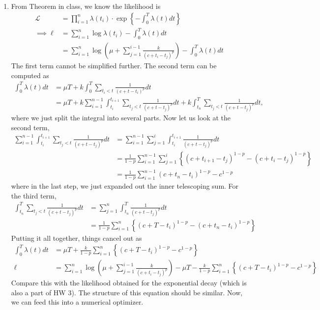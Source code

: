 \documentclass[11pt]{article}
\begin{document}
\begin{enumerate}
\begin{enumerate}
\item From Theorem in class, we know the likelihood is
\begin{align*}
	\mathcal{L} &= \prod_{i=1}^n \lambda(t_i) \cdot \exp\left\{ - \int_0^T \lambda(t) dt \right\} \\
	\implies \ell &= \sum_{i=1}^n \log \lambda(t_i)  - \int_0^T \lambda(t) dt \\
	&= \sum_{i=1}^n \log \left( \mu + \sum_{j=1}^{i-1} \frac{k}{(c + t_i - t_j)^p} \right)  - \int_0^T \lambda(t) dt
\end{align*}
The first term cannot be simplified further. The second term can be computed as
\begin{align*}
	\int_0^T \lambda(t) dt &= \mu T + k \int_0^T \sum_{t_i < t} \frac{1}{(c + t - t_i)^p} dt \\
	&= \mu T + k \sum_{i=1}^{n-1} \int_{t_i}^{t_{i+1}} \sum_{t_j < t} \frac{1}{(c + t - t_j)^p} dt + k \int_{t_n}^{T} \sum_{t_j < t} \frac{1}{(c + t - t_j)^p} dt,
\end{align*}
where we just split the integral into several parts. Now let us look at the second term,
\begin{align*}
	\sum_{i=1}^{n-1} \int_{t_i}^{t_{i+1}} \sum_{t_j < t} \frac{1}{(c + t - t_j)^p} dt &= \sum_{i=1}^{n-1} \sum_{j = 1}^i \int_{t_i}^{t_{i+1}}  \frac{1}{(c + t - t_j)^p} dt \\
	&= \frac{1}{1-p} \sum_{i=1}^{n-1} \sum_{j = 1}^i \left\{ (c + t_{i+1} - t_j)^{1-p} - (c + t_i - t_j)^{1-p} \right\} \\
	&= \frac{1}{1-p} \sum_{i=1}^{n-1} (c + t_n - t_i)^{1-p} - c^{1-p}
\end{align*}
where in the last step, we just expanded out the inner telescoping sum. For the third term,
\begin{align*}
	\int_{t_n}^{T} \sum_{t_j < t} \frac{1}{(c + t - t_j)^p} dt &= \sum_{j=1}^n \int_{t_n}^T \frac{1}{(c + t - t_j)^p} dt \\
	&= \frac{1}{1-p} \sum_{i=1}^n \left\{ (c + T - t_i)^{1-p} - (c + t_n - t_i)^{1-p} \right\}
\end{align*}
Putting it all together, things cancel out as
\begin{align*}
	\int_0^T \lambda(t) dt&= \mu T  + \frac{k}{1 - p} \sum_{i=1}^n \left\{ (c + T - t_i)^{1-p} - c^{1-p} \right\} \\
	\ell &= \sum_{i=1}^n \log \left( \mu + \sum_{j=1}^{i-1} \frac{k}{(c + t_i - t_j)^p} \right) - \mu T  - \frac{k}{1 - p} \sum_{i=1}^n \left\{ (c + T - t_i)^{1-p} - c^{1-p} \right\}
\end{align*}
Compare this with the likelihood obtained for the exponential decay (which is also a part of HW 3). The structure of this equation should be similar. Now, we can feed this into a numerical optimizer.


\end{enumerate}
\end{enumerate}
\end{document}
